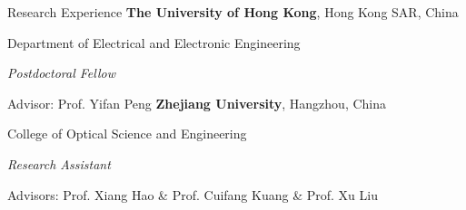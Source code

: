 \begin{rubric}{Research Experience}
	\entry*[2024/04 -- Present]%
	\textbf{The University of Hong Kong}, Hong Kong SAR, China
	\par Department of Electrical and Electronic Engineering
	\par \textit{Postdoctoral Fellow}
	\par Advisor: Prof. Yifan Peng
    \entry*[2024/01 -- 2024/03]%
	\textbf{Zhejiang University}, Hangzhou, China
	\par College of Optical Science and Engineering
	\par \textit{Research Assistant}
	\par Advisors: Prof. Xiang Hao \& Prof. Cuifang Kuang \& Prof. Xu Liu
\end{rubric}

